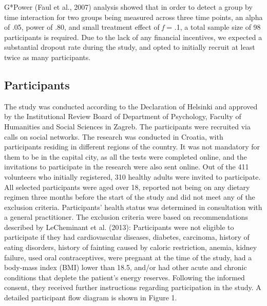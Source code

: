 \documentclass[authordate, empirical]{jote-new-article}
\begin{document}
G*Power (Faul et al., 2007) analysis showed that in order to detect a group by time interaction for two groups being measured across three time points, an alpha of .05, power of .80, and small treatment effect of \emph{f }= .1, a total sample size of 98 participants is required. Due to the lack of any financial incentives, we expected a substantial dropout rate during the study, and opted to initially recruit at least twice as many participants.



\subsection{Participants}



The study was conducted according to the Declaration of Helsinki and approved by the Institutional Review Board of Department of Psychology, Faculty of Humanities and Social Sciences in Zagreb. The participants were recruited via calls on social networks. The research was conducted in Croatia, with participants residing in different regions of the country. It was not mandatory for them to be in the capital city, as all the tests were completed online, and the invitations to participate in the research were also sent online. Out of the 411 volunteers who initially registered, 310 healthy adults were invited to participate. All selected participants were aged over 18, reported not being on any dietary regimen three months before the start of the study and did not meet any of the exclusion criteria. Participants' health status was determined in consultation with a general practitioner. The exclusion criteria were based on recommendations described by LeCheminant et al. (2013): Participants were not eligible to participate if they had cardiovascular diseases, diabetes, carcinoma, history of eating disorders, history of fainting caused by caloric restriction, anemia, kidney failure, used oral contraceptives, were pregnant at the time of the study, had a body-mass index (BMI) lower than 18.5, and/or had other acute and chronic conditions that deplete the patient's energy reserves. Following the informed consent, they received further instructions regarding participation in the study. A detailed participant flow diagram is shown in Figure 1.
\end{document}
